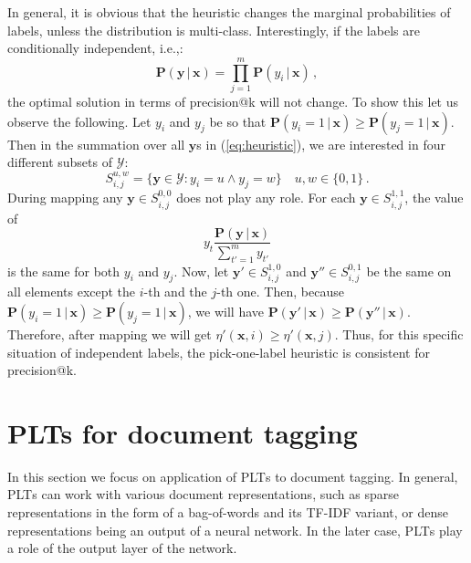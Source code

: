 \documentclass{article}
\newcommand{\Algo}[1]{\textsc{#1}}
\renewcommand{\vec}[1]{\boldsymbol{#1}}
\newcommand{\bx}{\vec{x}}
\newcommand{\by}{\vec{y}}
\newcommand{\calY}{\mathcal{Y}}
\newcommand{\prob}{\mathbf{P}}
\newcommand{\given}{\, | \,}
\newcommand{\sectionBefore}{-0pt}
\newcommand{\sectionAfter}{-0pt}
\begin{document}
In general, it is obvious that the heuristic changes the marginal probabilities of labels, unless the distribution is multi-class. 
Interestingly, if the labels are conditionally independent, i.e.,:
$$
\prob(\by \given \bx) = \prod_{j=1}^m \prob(y_i \given \bx)\,,
$$
the optimal solution in terms of precision@k will not change. To show this let us observe the following.
Let $y_i$ and $y_j$ be so that $\prob(y_i = 1 \given \bx) \ge \prob(y_j = 1 \given \bx) $. Then in the summation over all $\by$s in (\ref{eq:heuristic}), we are interested in four different subsets of $\calY$: 
$$
S_{i,j}^{u,w}  =  \{\by\in \calY: y_i = u \land y_j = w\} \quad u,w \in \{0,1\} \,.
$$
During mapping any $\by \in S^{0,0}_{i,j}$ does not play any role. For each $\by \in S^{1,1}_{i,j}$, the value of 
$$
y_t \frac{\prob(\by \given \bx)}{\sum_{t'=1}^m y_{t'}}
$$ 
is the same for both $y_i$ and $y_j$. Now, let $\by' \in S^{1,0}_{i,j}$ and $\by'' \in S^{0,1}_{i,j}$ be the same on all elements except the $i$-th and the $j$-th one. Then, because   $\prob(y_i = 1 \given \bx) \ge \prob(y_j = 1 \given \bx) $, we will have $\prob(\by' \given \bx) \ge \prob(\by'' \given \bx)$. Therefore, after mapping we will get $\eta'(\bx,i) \ge \eta'(\bx, j)$. 
Thus, for this specific situation of independent labels, the pick-one-label heuristic is consistent for precision@k.

%
%
%




\vspace{\sectionBefore}
\section{PLTs for document tagging}
\label{sec:tagging_PLTs}
\vspace{\sectionAfter}

In this section we focus on application of \Algo{PLT}s to document tagging. In general, \Algo{PLT}s can work with various document representations, such as sparse representations in the form of a bag-of-words and its TF-IDF variant, or dense representations being an output of a neural network. In the later case, \Algo{PLT}s play a role of the output layer of the network. 
  
\end{document}
